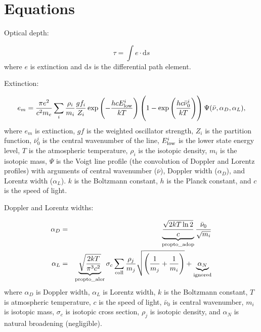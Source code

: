 \documentclass[letterpaper,12pt]{article}
\begin{document}
\section{Equations}
\label{sec:equations}
Optical depth:

\begin{equation}
\label{eqn:tau}
\tau = \int e \cdot \mathrm{d}s
\end{equation}
\noindent
where $e$ is extinction and d$s$ is the differential path element. \newline

\noindent
Extinction:

\begin{equation}
\label{eq:ext}
  e_m = \frac{\pi e^2}{c^2 m_e} \sum_i \frac{\rho_i}{m_i} \frac{gf_i}{Z_i}
      \exp\left(-\frac{hcE_{\rm low}^i}{kT}\right)
      \left(1-\exp\left(\frac{hc\bar\nu_0^i}{kT}\right)\right)
      \Psi(\bar\nu, \alpha_D, \alpha_L),
\end{equation}
\noindent
where $e_m$ is extinction, $gf$ is the weighted oscillator strength, $Z_i$ is the partition function, $\bar\nu_0^i$ is the central wavenumber of the line, $E_{\rm low}^i$ is the lower state energy level, $T$ is the atmospheric temperature, $\rho_i$ is the isotopic density, $m_i$ is the isotopic mass, $\Psi$ is the Voigt line profile (the convolution of Doppler and Lorentz profiles) with arguments of central wavenumber ($\bar\nu$), Doppler width ($\alpha_D$), and Lorentz width ($\alpha_L$). $k$ is the Boltzmann constant, $h$ is the Planck constant, and $c$ is the speed of light.  \newline

\noindent
Doppler and Lorentz widths:

\begin{eqnarray}
\label{eqn:doppler}
 \alpha_D &=& \underbrace{\frac{\sqrt{2k T \ln{2}}}{c}}_{\rm{propto\_adop}}
              \frac{\bar\nu_0}{\sqrt{m_i}} \label{dopbr} \\
\label{eqn:lorentz}
 \alpha_L &=& \underbrace{\sqrt{\frac{2k T}{\pi^3c^2}}}_{\rm{propto\_alor}}
              \sigma_c\sum_{\rm coll}\frac{\rho_j}{m_j}
              \sqrt{\left(\frac{1}{m_j} + \frac{1}{m_i}\right)}
              + \underbrace{\alpha_{N}}_{\mathrm{ignored}}
\end{eqnarray}
\noindent
where $\alpha_D$ is Doppler width, $\alpha_L$ is Lorentz width, $k$ is the Boltzmann constant, $T$ is atmospheric temperature, $c$ is the speed of light, $\bar\nu_0$ is central wavenumber, $m_i$ is isotopic mass, $\sigma_c$ is isotopic cross section, $\rho_j$ is isotopic density, and $\alpha_N$ is natural broadening (negligible). \newline
\end{document}
